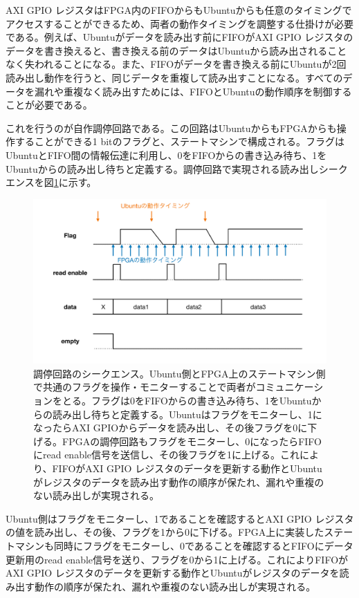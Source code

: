 AXI GPIO レジスタはFPGA内のFIFOからもUbuntuからも任意のタイミングでアクセスすることができるため、両者の動作タイミングを調整する仕掛けが必要である。例えば、Ubuntuがデータを読み出す前にFIFOがAXI GPIO レジスタのデータを書き換えると、書き換える前のデータはUbuntuから読み出されることなく失われることになる。また、FIFOがデータを書き換える前にUbuntuが2回読み出し動作を行うと、同じデータを重複して読み出すことになる。すべてのデータを漏れや重複なく読み出すためには、FIFOとUbuntuの動作順序を制御することが必要である。

これを行うのが自作調停回路である。この回路はUbuntuからもFPGAからも操作することができる1 bitのフラグと、ステートマシンで構成される。フラグはUbuntuとFIFO間の情報伝達に利用し、0をFIFOからの書き込み待ち、1をUbuntuからの読み出し待ちと定義する。調停回路で実現される読み出しシークエンスを図\ref{JATHubarbitation}に示す。

\begin{figure} 
\centering
\includegraphics[width=16cm]{fig/QAQC/JATHubarbitation.pdf}
\caption[調停回路のシークエンス]{調停回路のシークエンス。Ubuntu側とFPGA上のステートマシン側で共通のフラグを操作・モニターすることで両者がコミュニケーションをとる。フラグは0をFIFOからの書き込み待ち、1をUbuntuからの読み出し待ちと定義する。Ubuntuはフラグをモニターし、1になったらAXI GPIOからデータを読み出し、その後フラグを0に下げる。FPGAの調停回路もフラグをモニターし、0になったらFIFOにread enable信号を送信し、その後フラグを1に上げる。これにより、FIFOがAXI GPIO レジスタのデータを更新する動作とUbuntuがレジスタのデータを読み出す動作の順序が保たれ、漏れや重複のない読み出しが実現される。}
\label{JATHubarbitation}
\end{figure}

Ubuntu側はフラグをモニターし、1であることを確認するとAXI GPIO レジスタの値を読み出し、その後、フラグを1から0に下げる。FPGA上に実装したステートマシンも同時にフラグをモニターし、0であることを確認するとFIFOにデータ更新用のread enable信号を送り、フラグを0から1に上げる。これによりFIFOがAXI GPIO レジスタのデータを更新する動作とUbuntuがレジスタのデータを読み出す動作の順序が保たれ、漏れや重複のない読み出しが実現される。

